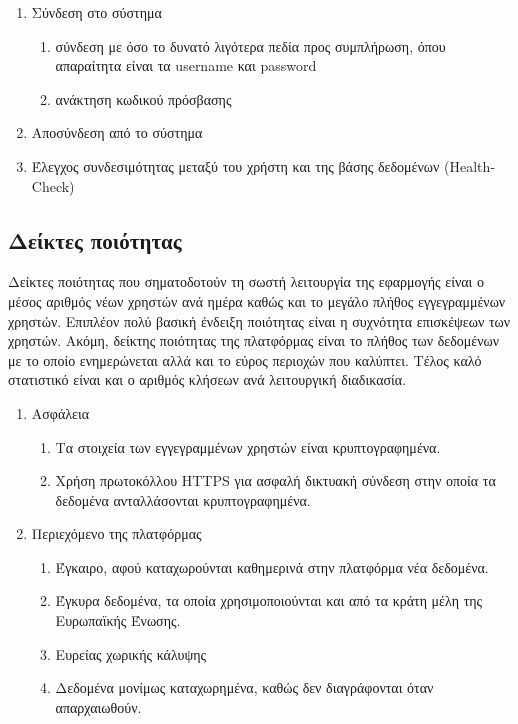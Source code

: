 \documentclass[a4paper,12pt, oneside]{article}
\begin{document}
\begin{enumerate}
   \item Σύνδεση στο σύστημα
    \begin{enumerate}
     \item σύνδεση με όσο το δυνατό λιγότερα πεδία προς συμπλήρωση, όπου \\ απαραίτητα είναι τα \textlatin{username} και  \textlatin{password}
     \item ανάκτηση κωδικού πρόσβασης
    \end{enumerate}
  \item Αποσύνδεση από το σύστημα
  \item Έλεγχος συνδεσιμότητας μεταξύ του χρήστη και της βάσης δεδομένων \textlatin{(HealthCheck)}
\end{enumerate}


\subsection{Δείκτες ποιότητας}
Δείκτες ποιότητας που σηματοδοτούν τη σωστή λειτουργία της εφαρμογής είναι ο μέσος αριθμός νέων χρηστών ανά ημέρα καθώς και το μεγάλο πλήθος εγγεγραμμένων χρηστών. Επιπλέον πολύ βασική ένδειξη ποιότητας είναι  η συχνότητα επισκέψεων των χρηστών. Ακόμη, δείκτης ποιότητας της πλατφόρμας είναι το πλήθος των δεδομένων με το οποίο ενημερώνεται αλλά και το εύρος περιοχών που καλύπτει. Τέλος καλό στατιστικό είναι και ο αριθμός κλήσεων ανά λειτουργική διαδικασία.

\renewcommand{\theenumi}{\arabic{enumi}}
\renewcommand{\theenumii}{\alph{enumii}}
\begin{enumerate}
   \item Ασφάλεια 
   \begin{enumerate}
     \item Τα στοιχεία των εγγεγραμμένων χρηστών είναι κρυπτογραφημένα.
     \item Χρήση πρωτοκόλλου \textlatin{HTTPS} για ασφαλή δικτυακή σύνδεση στην οποία τα δεδομένα ανταλλάσονται κρυπτογραφημένα.
   \end{enumerate}
   \item Περιεχόμενο της πλατφόρμας
   \begin{enumerate}
     \item Έγκαιρο, αφού καταχωρούνται καθημερινά στην πλατφόρμα νέα δεδομένα.
     \item Έγκυρα δεδομένα, τα οποία χρησιμοποιούνται και από τα κράτη μέλη της Ευρωπαϊκής Ένωσης.
     \item Ευρείας χωρικής κάλυψης
     \item Δεδομένα μονίμως καταχωρημένα, καθώς δεν διαγράφονται όταν απαρχαιωθούν.
   \end{enumerate}
\end{enumerate}
\end{document}
